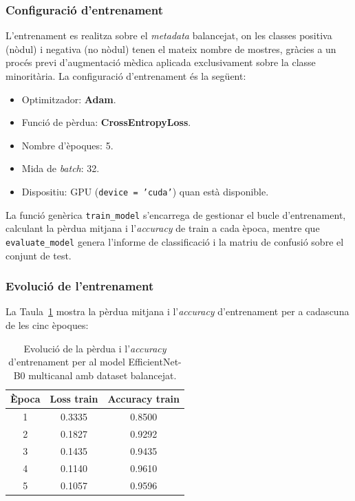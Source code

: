 \documentclass[12pt,a4paper]{article}
\begin{document}
\subsubsection{Configuració d’entrenament}

L’entrenament es realitza sobre el \textit{metadata} balancejat, on les classes positiva (nòdul) i negativa
(no nòdul) tenen el mateix nombre de mostres, gràcies a un procés previ d’augmentació mèdica aplicada
exclusivament sobre la classe minoritària. La configuració d’entrenament és la següent:

\begin{itemize}
    \item Optimitzador: \textbf{Adam}.
    \item Funció de pèrdua: \textbf{CrossEntropyLoss}.
    \item Nombre d’èpoques: 5.
    \item Mida de \textit{batch}: 32.
    \item Dispositiu: GPU (\texttt{device = 'cuda'}) quan està disponible.
\end{itemize}

La funció genèrica \texttt{train\_model} s’encarrega de gestionar el bucle d’entrenament, calculant la
pèrdua mitjana i l’\textit{accuracy} de train a cada època, mentre que \texttt{evaluate\_model} genera
l’informe de classificació i la matriu de confusió sobre el conjunt de test.

\subsubsection{Evolució de l’entrenament}

La Taula~\ref{tab:effb0_multicanal_train} mostra la pèrdua mitjana i l’\textit{accuracy} d’entrenament
per a cadascuna de les cinc èpoques:

\begin{table}[H]
    \centering
    \caption{Evolució de la pèrdua i l’\textit{accuracy} d’entrenament per al model EfficientNet-B0 multicanal amb dataset balancejat.}
    \label{tab:effb0_multicanal_train}
    \begin{tabular}{c c c}
        \hline
        Època & Loss train & Accuracy train \\
        \hline
        1 & 0.3335 & 0.8500 \\
        2 & 0.1827 & 0.9292 \\
        3 & 0.1435 & 0.9435 \\
        4 & 0.1140 & 0.9610 \\
        5 & 0.1057 & 0.9596 \\
        \hline
    \end{tabular}
\end{table}
\end{document}
